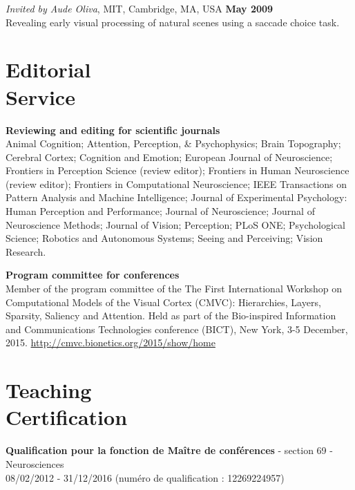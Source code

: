 \documentclass[margin,line]{resume}
\begin{document}
\begin{resume}
\vspace{-2mm} 
\textit{Invited by Aude Oliva}, MIT, Cambridge, MA, USA \hfill \textbf{May 2009}\\
Revealing early visual processing of natural scenes using a saccade choice task.

\normalsize


	\vspace{3mm}
	\section{\mysidestyle Editorial\\Service}

 \textbf{Reviewing and editing for scientific journals} \\
Animal Cognition; 
Attention, Perception, \& Psychophysics; 
Brain Topography;  
Cerebral Cortex; 
Cognition and Emotion;
European Journal of Neuroscience;
Frontiers in Perception Science (review editor); 
Frontiers in Human Neuroscience (review editor); 
Frontiers in Computational Neuroscience; 
IEEE Transactions on Pattern Analysis and Machine Intelligence;
Journal of Experimental Psychology: Human Perception and Performance;
Journal of Neuroscience;
Journal of Neuroscience Methods;
Journal of Vision;
Perception;
PLoS ONE; 
Psychological Science;
Robotics and Autonomous Systems;
Seeing and Perceiving;
Vision Research.

\textbf{Program committee for conferences} \\
Member of the program committee of the The First International Workshop on Computational Models of the Visual Cortex (CMVC): Hierarchies, Layers, Sparsity, Saliency and Attention. Held as part of the Bio-inspired Information and Communications Technologies conference (BICT), New York, 3-5 December, 2015.
 \url{http://cmvc.bionetics.org/2015/show/home}
 
	\vspace{3mm}
	\section{\mysidestyle Teaching\\Certification}
    \textbf{Qualification pour la fonction de Maître de conférences} - section 69 - Neurosciences\\
    08/02/2012 - 31/12/2016 (numéro de qualification : 12269224957)



\end{resume}
\end{document}
